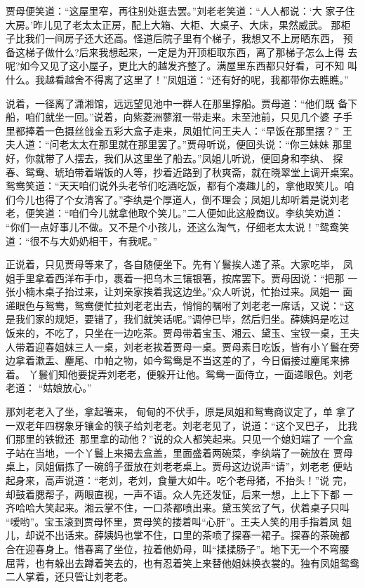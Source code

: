贾母便笑道：“这屋里窄，再往别处逛去罢。”刘老老笑道：“人人都说：‘大
家子住大房。’昨儿见了老太太正房，配上大箱、大柜、大桌子、大床，果然威武。
那柜子比我们一间房子还大还高。怪道后院子里有个梯子，我想又不上房晒东西，
预备这梯子做什么?后来我想起来，一定是为开顶柜取东西，离了那梯子怎么上得
去呢?如今又见了这小屋子，更比大的越发齐整了。满屋里东西都只好看，可不知
叫什么。我越看越舍不得离了这里了！”凤姐道：“还有好的呢，我都带你去瞧瞧。”

说着，一径离了潇湘馆，远远望见池中一群人在那里撑船。贾母道：“他们既
备下船，咱们就坐一回。”说着，向紫菱洲蓼溆一带走来。未至池前，只见几个婆
子手里都捧着一色摄丝戗金五彩大盒子走来，凤姐忙问王夫人：“早饭在那里摆？”
王夫人道：“问老太太在那里就在那里罢了。”贾母听说，便回头说：“你三妹妹
那里好，你就带了人摆去，我们从这里坐了船去。”凤姐儿听说，便回身和李纨、
探春、鸳鸯、琥珀带着端饭的人等，抄着近路到了秋爽斋，就在晓翠堂上调开桌案。
鸳鸯笑道：“天天咱们说外头老爷们吃酒吃饭，都有个凑趣儿的，拿他取笑儿。咱
们今儿也得了个女清客了。”李纨是个厚道人，倒不理会；凤姐儿却听着是说刘老
老，便笑道：“咱们今儿就拿他取个笑儿。”二人便如此这般商议。李纨笑劝道：
“你们一点好事儿不做。又不是个小孩儿，还这么淘气，仔细老太太说！”鸳鸯笑
道：“很不与大奶奶相干，有我呢。”

正说着，只见贾母等来了，各自随便坐下。先有丫鬟挨人递了茶。大家吃毕，
凤姐手里拿着西洋布手巾，裹着一把乌木三镶银箸，按席罢下。贾母因说：“把那
一张小楠木桌子抬过来，让刘亲家挨着我这边坐。”众人听说，忙抬过来。凤姐一
面递眼色与鸳鸯，鸳鸯便忙拉刘老老出去，悄悄的嘱咐了刘老老一席话，又说：“这
是我们家的规矩，要错了，我们就笑话呢。”调停已毕，然后归坐。薛姨妈是吃过
饭来的，不吃了，只坐在一边吃茶。贾母带着宝玉、湘云、黛玉、宝钗一桌，王夫
人带着迎春姐妹三人一桌，刘老老挨着贾母一桌。贾母素日吃饭，皆有小丫鬟在旁
边拿着漱盂、麈尾、巾帕之物，如今鸳鸯是不当这差的了，今日偏接过麈尾来拂着。
丫鬟们知他要捉弄刘老老，便躲开让他。鸳鸯一面侍立，一面递眼色。刘老老道：
“姑娘放心。”

那刘老老入了坐，拿起箸来，甸甸的不伏手，原是凤姐和鸳鸯商议定了，单
拿了一双老年四楞象牙镶金的筷子给刘老老。刘老老见了，说道：“这个叉巴子，
比我们那里的铁锨还，那里拿的动他？”说的众人都笑起来。只见一个媳妇端了
一个盒子站在当地，一个丫鬟上来揭去盒盖，里面盛着两碗菜，李纨端了一碗放在
贾母桌上，凤姐偏拣了一碗鸽子蛋放在刘老老桌上。贾母这边说声“请”，刘老老
便站起身来，高声说道：“老刘，老刘，食量大如牛。吃个老母猪，不抬头！”说
完，却鼓着腮帮子，两眼直视，一声不语。众人先还发怔，后来一想，上上下下都
一齐哈哈大笑起来。湘云掌不住，一口茶都喷出来。黛玉笑岔了气，伏着桌子只叫
“嗳哟”。宝玉滚到贾母怀里，贾母笑的搂着叫“心肝”。王夫人笑的用手指着凤
姐儿，却说不出话来。薛姨妈也掌不住，口里的茶喷了探春一裙子。探春的茶碗都
合在迎春身上。惜春离了坐位，拉着他奶母，叫“揉揉肠子”。地下无一个不弯腰
屈背，也有躲出去蹲着笑去的，也有忍着笑上来替他姐妹换衣裳的。独有凤姐鸳鸯
二人掌着，还只管让刘老老。

